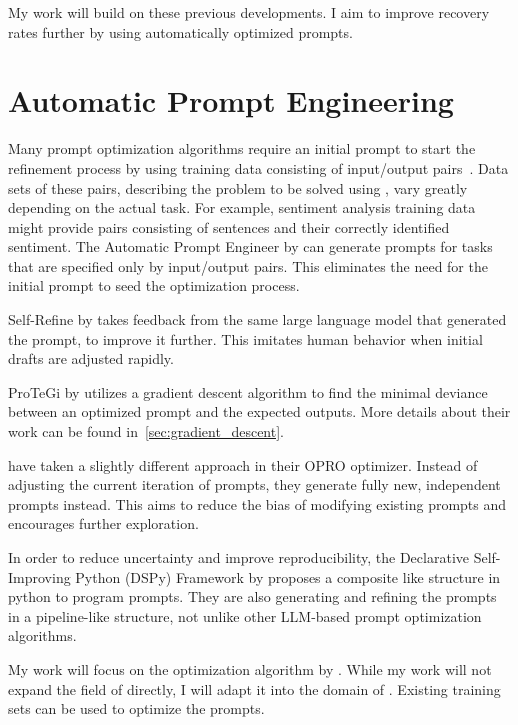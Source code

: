 My work will build on these previous developments. 
I aim to improve recovery rates further by using automatically optimized prompts.


\section{Automatic Prompt Engineering}
\label{related:sec:ape}
Many prompt optimization algorithms require an initial prompt to start the refinement process by using training data consisting of input/output pairs~\cite{ramnath2025SystematicSurvey}. 
Data sets of these pairs, describing the problem to be solved using \LLMs, vary greatly depending on the actual task.
For example, sentiment analysis training data might provide pairs consisting of sentences and their correctly identified sentiment.
The Automatic Prompt Engineer by  can generate prompts for tasks that are specified only by input/output pairs.
This eliminates the need for the initial prompt to seed the optimization process.

Self-Refine by  takes feedback from the same large language model that generated the prompt, to improve it further.
This imitates human behavior when initial drafts are adjusted rapidly.

ProTeGi by  utilizes a gradient descent algorithm to find the minimal deviance between an optimized prompt and the expected outputs.
More details about their work can be found in~\ref{sec:gradient_descent}.

 have taken a slightly different approach in their OPRO optimizer.
Instead of adjusting the current iteration of prompts, they generate fully new, independent prompts instead. This aims to reduce the bias of modifying existing prompts and encourages further exploration.

In order to reduce uncertainty and improve reproducibility, the Declarative Self-Improving Python (DSPy) Framework by  proposes a composite like structure in python to program prompts.
They are also generating and refining the prompts in a pipeline-like structure, not unlike other LLM-based prompt optimization algorithms.

My work will focus on the optimization algorithm by \citeauthor{pryzant2023AutomaticPrompt}. 
While my work will not expand the field of \APE directly, I will adapt it into the domain of \TLR. 
Existing training sets can be used to optimize the prompts.

